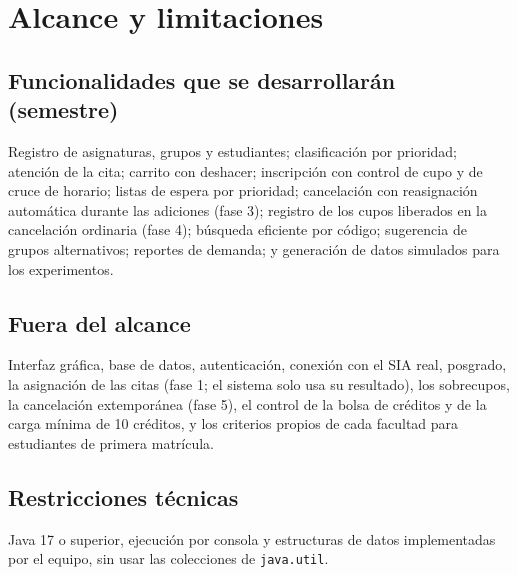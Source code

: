 \documentclass[conference]{IEEEtran}
\begin{document}

\section{Alcance y limitaciones}

\subsection{Funcionalidades que se desarrollarán (semestre)}
Registro de asignaturas, grupos y estudiantes; clasificación por prioridad; atención de la cita; carrito con deshacer; inscripción con control de cupo y de cruce de horario; listas de espera por prioridad; cancelación con reasignación automática durante las adiciones (fase 3); registro de los cupos liberados en la cancelación ordinaria (fase 4); búsqueda eficiente por código; sugerencia de grupos alternativos; reportes de demanda; y generación de datos simulados para los experimentos.

\subsection{Fuera del alcance}
Interfaz gráfica, base de datos, autenticación, conexión con el SIA real, posgrado, la asignación de las citas (fase 1; el sistema solo usa su resultado), los sobrecupos, la cancelación extemporánea (fase 5), el control de la bolsa de créditos y de la carga mínima de 10 créditos, y los criterios propios de cada facultad para estudiantes de primera matrícula.

\subsection{Restricciones técnicas}
Java 17 o superior, ejecución por consola y estructuras de datos implementadas por el equipo, sin usar las colecciones de \texttt{java.util}.
\end{document}
